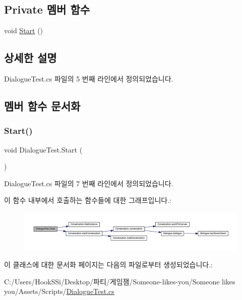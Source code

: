 \subsection*{Private 멤버 함수}
\begin{DoxyCompactItemize}
\item 
void \mbox{\hyperlink{class_dialogue_test_ac923cb2d975ec1c28e6b76277790af63}{Start}} ()
\end{DoxyCompactItemize}


\subsection{상세한 설명}


Dialogue\+Test.\+cs 파일의 5 번째 라인에서 정의되었습니다.



\subsection{멤버 함수 문서화}
\mbox{\label{class_dialogue_test_ac923cb2d975ec1c28e6b76277790af63}} 
\subsubsection{\texorpdfstring{Start()}{Start()}}
{\footnotesize\ttfamily void Dialogue\+Test.\+Start (\begin{DoxyParamCaption}{ }\end{DoxyParamCaption})\hspace{0.3cm}{\ttfamily [private]}}



Dialogue\+Test.\+cs 파일의 7 번째 라인에서 정의되었습니다.


\begin{DoxyCode}{0}

\end{DoxyCode}
이 함수 내부에서 호출하는 함수들에 대한 그래프입니다.\+:\nopagebreak
\begin{figure}[H]
\begin{center}
\leavevmode
\includegraphics[width=350pt]{dd/d62/class_dialogue_test_ac923cb2d975ec1c28e6b76277790af63_cgraph}
\end{center}
\end{figure}


이 클래스에 대한 문서화 페이지는 다음의 파일로부터 생성되었습니다.\+:\begin{DoxyCompactItemize}
\item 
C\+:/\+Users/\+Hook\+S\+Si/\+Desktop/파티/게임잼/\+Someone-\/likes-\/you/\+Someone likes you/\+Assets/\+Scripts/\mbox{\hyperlink{_dialogue_test_8cs}{Dialogue\+Test.\+cs}}\end{DoxyCompactItemize}
